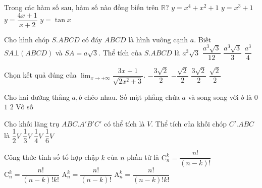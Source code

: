 \begin{ex}%
Trong các hàm số sau, hàm số nào đồng biến trên $\mathbb{R}$?
\choice
{$y=x^4+x^2+1$}
{\True $y=x^3+1$}
{$y=\dfrac{4x+1}{x+2}$}
{$y=\tan x$}
\end{ex}

\begin{ex}%
Cho hình chóp $S.ABCD$ có đáy $ABCD$ là hình vuông cạnh $a$. Biết $SA\bot (ABCD)$ và $SA=a\sqrt{3}$. Thể tích của $S.ABCD$ là
\choice
{$a^3\sqrt{3}$}
{$\dfrac{a^3\sqrt{3}}{12}$}
{\True $\dfrac{a^3\sqrt{3}}{3}$}
{$\dfrac{a^3}{4}$}
\end{ex}

\begin{ex}%
Chọn kết quả đúng của $\displaystyle\lim_{x\rightarrow +\infty}\dfrac{3x+1}{\sqrt{2x^2+3}}$.
\choice
{$-\dfrac{3\sqrt{2}}{2}$}
{$-\dfrac{\sqrt{2}}{2}$}
{\True $\dfrac{3\sqrt{2}}{2}$}
{$\dfrac{\sqrt{2}}{2}$}
\end{ex}
\begin{ex}%
Cho hai đường thẳng $a,b$ chéo nhau. Số mặt phẳng chứa $a$ và song song với $b$ là
\choice
{$0$}
{\True $1$}
{$2$}
{Vô số}
\end{ex}

\begin{ex}%
Cho khối lăng trụ $ABC.A'B'C'$ có thể tích là $V$. Thể tích của khối chóp $C'.ABC$ là
\choice
{$\dfrac{1}{2}V$}
{\True $\dfrac{1}{3}V$}
{$\dfrac{1}{4}V$}
{$\dfrac{1}{6}V$}
\end{ex}

\begin{ex}%
Công thức tính số tổ hợp chập $k$ của $n$ phần tử là
\choice
{$\mathrm{C}_n^k=\dfrac{n!}{(n-k)!}$}
{\True $\mathrm{C}_n^k=\dfrac{n!}{(n-k)!k!}$}
{$\mathrm{A}_n^k=\dfrac{n!}{(n-k)!}$}
{$\mathrm{A}_n^k=\dfrac{n!}{(n-k)!k!}$}
\end{ex}

